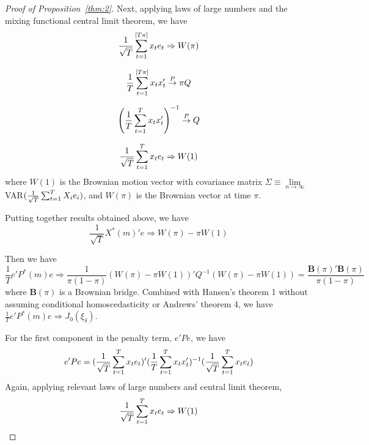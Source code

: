 \begin{proof}[Proof of Proposition~\ref{thm:2}]
\noindent Next, applying laws of large numbers and the mixing functional central limit theorem, we have
    \begin{equation*}
        \frac{1}{\sqrt{T}} \sum_{t=1}^{[T \pi]} x_t e_t \Rightarrow W(\pi)
    \end{equation*}
        
    \begin{equation*}
        \frac{1}{T} \sum_{t=1}^{[T \pi]} x_t x_t' \stackrel{P}{\rightarrow} \pi Q
    \end{equation*}
    
    \begin{equation*}
        \left( \frac{1}{T} \sum_{t=1}^{T} x_t x_t' \right) ^{-1} \stackrel{P}{\rightarrow} Q
    \end{equation*}
    
    \begin{equation*}
        \frac{1}{\sqrt{T}} \sum_{t=1}^{T} x_t e_t \Rightarrow W(1)
    \end{equation*}
where $W(1)$ is the Brownian motion vector with covariance matrix $\Sigma \equiv \lim\limits_{n\to\infty}$VAR$(\frac{1}{\sqrt{T}}\sum_{t=1}^{T} X_i e_i)$, and $W(\pi)$ is the Brownian vector at time $\pi$.

\noindent Putting together results obtained above, we have
    \begin{equation*}
        \frac{1}{\sqrt{T}} X^{*}(m)'e \Rightarrow W(\pi) - \pi W(1)
    \end{equation*}

\noindent Then we have
    \begin{equation*}
        \frac{1}{T} e'P^{*}(m)e \Rightarrow \frac{1}{\pi(1-\pi)} (W(\pi) - \pi W(1))'Q^{-1}(W(\pi) - \pi W(1)) =  \frac{\mathbf{B}(\pi)'\mathbf{B}(\pi)}{\pi(1-\pi)}
    \end{equation*}
where $\mathbf{B}(\pi)$ is a Brownian bridge. Combined with Hansen's \cite{hansen2009averaging} theorem 1 without assuming conditional homoscedasticity or Andrews' \cite{andrews93} theorem 4, we have $\frac{1}{T} e'P^{*}(m)e \Rightarrow J_0(\xi_{\delta})$.

\noindent For the first component in the penalty term, $e'Pe$, we have
    \begin{equation*}
      e'Pe = (\frac{1}{\sqrt{T}} \sum_{t=1}^{T} x_t e_t)'(\frac{1}{T} \sum_{t=1}^{T} x_t x_t')^{-1}(\frac{1}{\sqrt{T}} \sum_{t=1}^{T} x_t e_t)
    \end{equation*}
\noindent Again, applying relevant laws of large numbers and central limit theorem, 
    \begin{equation*}
      \frac{1}{\sqrt{T}} \sum_{t=1}^{T} x_t e_t \Rightarrow W(1)
    \end{equation*}


\end{proof}
